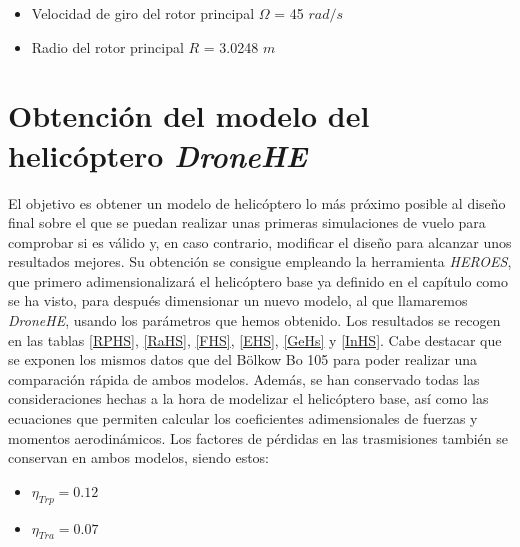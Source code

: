 \begin{itemize}
	\item Velocidad de giro del rotor principal $\Omega$ = 45 $rad/s$
	\item Radio del rotor principal $R$ = 3.0248 $m$
\end{itemize}

\section{Obtención del modelo del helicóptero \emph{DroneHE}}

El objetivo es obtener un modelo de helicóptero lo más próximo posible al diseño final sobre el que se puedan realizar unas primeras simulaciones de vuelo para comprobar si es válido y, en caso contrario, modificar el diseño para alcanzar unos resultados mejores. Su obtención se consigue empleando la herramienta \emph{HEROES}, que primero adimensionalizará el helicóptero base ya definido en el capítulo como se ha visto, para después dimensionar un nuevo modelo, al que llamaremos \emph{DroneHE}, usando los parámetros que hemos obtenido. Los resultados se recogen en las tablas \ref{RPHS}, \ref{RaHS}, \ref{FHS}, \ref{EHS}, \ref{GeHs} y \ref{InHS}.
Cabe destacar que se exponen los mismos datos que del Bölkow Bo 105 para poder realizar una comparación rápida de ambos modelos. Además, se han conservado todas las consideraciones hechas a la hora de modelizar el helicóptero base, así como las ecuaciones que permiten calcular los coeficientes adimensionales de fuerzas y momentos aerodinámicos. Los factores de pérdidas en las trasmisiones también se conservan en ambos modelos, siendo estos:

\begin{itemize}
	\item $\eta_{Trp}=0.12$
	\item $\eta_{Tra}=0.07$
\end{itemize}


